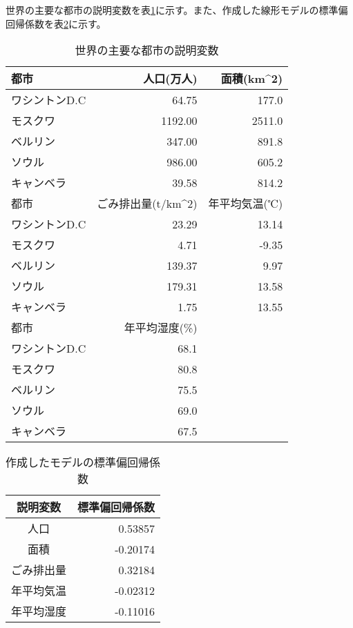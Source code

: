 \documentclass[a4paper,10pt,twocolumn]{jsarticle}
\begin{document}
世界の主要な都市の説明変数を表\ref{table:expl}に示す。また、作成した線形モデルの標準偏回帰係数を表\ref{table:coef}に示す。
\begin{table}[h]
 \caption{世界の主要な都市の説明変数}
 \label{table:expl}
 \centering
  \begin{tabular}{lrr}
   \hline
	 \hline
	 都市 & 人口(万人) & 面積(km^2) \\
   \hline \hline
	 ワシントンD.C & 64.75 & 177.0 \\
	 モスクワ & 1192.00 & 2511.0 \\
	 ベルリン & 347.00 & 891.8 \\
	 ソウル & 986.00 & 605.2 \\
	 キャンベラ & 39.58 & 814.2 \\
	 \hline
   \hline
	 都市 & ごみ排出量(t/km^2) & 年平均気温(℃) \\
	 \hline
	 \hline
	 ワシントンD.C & 23.29 & 13.14 \\
	 モスクワ & 4.71 & -9.35 \\
	 ベルリン & 139.37 & 9.97 \\
	 ソウル & 179.31 & 13.58 \\
	 キャンベラ & 1.75 & 13.55 \\
	 \hline
	 \hline
	 都市 & 年平均湿度(\%) \\
	 \hline
	 \hline
	 ワシントンD.C & 68.1 \\
	 モスクワ & 80.8 \\
	 ベルリン & 75.5 \\
	 ソウル & 69.0 \\
	 キャンベラ & 67.5 \\
	 \hline
	 \hline
  \end{tabular}
\end{table}
\begin{table}[h]
 \caption{作成したモデルの標準偏回帰係数}
 \label{table:coef}
 \centering
  \begin{tabular}{cr}
   \hline
	 \hline
	 説明変数 & 標準偏回帰係数 \\
   \hline \hline
	 人口 & 0.53857 \\
	 面積 & -0.20174 \\
	 ごみ排出量 & 0.32184 \\
	 年平均気温 & -0.02312 \\
	 年平均湿度 & -0.11016 \\
	 \hline
   \hline
  \end{tabular}
\end{table}
\end{document}
